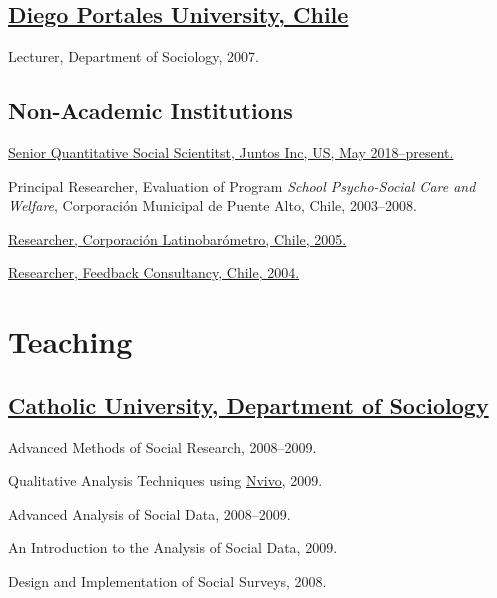 \documentclass[10pt,letterpaper]{article}
\renewenvironment{itemize}{
  \begin{list}{}{
    \setlength{\leftmargin}{1.5em}
    \setlength{\itemsep}{0.25em}
    \setlength{\parskip}{0pt}
    \setlength{\parsep}{0.25em}
  }
}{
  \end{list}
}
\begin{document}
\subsection*{\href{http://www.udp.cl/facultades_carreras/ciencias_sociales-historia/}{Diego Portales University, Chile}}

\begin{itemize}
\item Lecturer, Department of Sociology, 2007.
\end{itemize}

\subsection*{Non-Academic Institutions}

\begin{itemize}
\item \href{http://juntosglobal.com/}{Senior Quantitative Social Scientitst, Juntos Inc, US, May 2018--present.}
\item Principal Researcher, Evaluation of Program \textit{School Psycho-Social Care and Welfare}, Corporación Municipal de Puente Alto, Chile, 2003--2008.
\item \href{http://www.latinobarometro.org}{Researcher, Corporación Latinobarómetro, Chile, 2005.}
\item \href{http://www.feedback.cl}{Researcher, Feedback Consultancy, Chile, 2004.}
\end{itemize}


\section*{Teaching}

\subsection*{\href{http://sociologia.uc.cl/}{Catholic University, Department of Sociology}}

\begin{itemize}
\item Advanced Methods of Social Research, 2008--2009.
\item Qualitative Analysis Techniques using \href{http://www.qsrinternational.com/}{Nvivo}, 2009.
\item Advanced Analysis of Social Data, 2008--2009.
\item An Introduction to the Analysis of Social Data, 2009.
\item Design and Implementation of Social Surveys, 2008.
\end{itemize}
\end{document}
